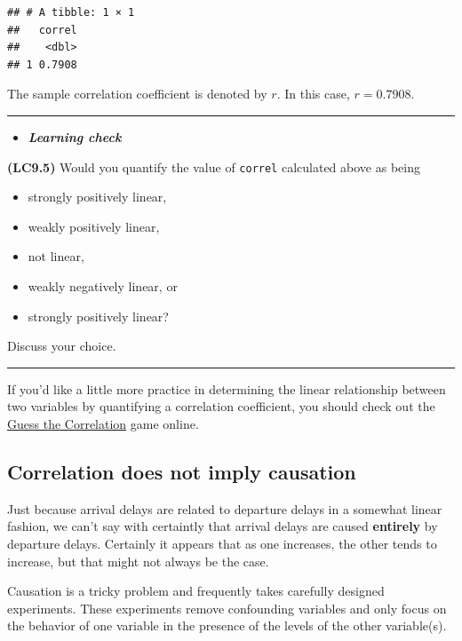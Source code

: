 \documentclass[]{tufte-book}
\let\oldrule=\rule
\renewcommand{\rule}[1]{\oldrule{\linewidth}}
\providecommand{\tightlist}{%
  \setlength{\itemsep}{0pt}\setlength{\parskip}{0pt}}
\newenvironment{rmdblock}[1]
  {\begin{shaded*}
  \begin{itemize}
  \renewcommand{\labelitemi}{
    \raisebox{-.7\height}[0pt][0pt]{
    }
  }
  \item
  }
  {
  \end{itemize}
  \end{shaded*}
  }
\newenvironment{learncheck}
  {\begin{rmdblock}{warning}}
  {\end{rmdblock}}
\begin{document}
\begin{verbatim}
## # A tibble: 1 × 1
##   correl
##    <dbl>
## 1 0.7908
\end{verbatim}

The sample correlation coefficient is denoted by \(r\). In this case,
\(r = 0.7908\).

\begin{center}\rule{0.5\linewidth}{\linethickness}\end{center}

\begin{learncheck}
\textbf{\emph{Learning check}}
\end{learncheck}

\textbf{(LC9.5)} Would you quantify the value of \texttt{correl}
calculated above as being

\begin{itemize}
\tightlist
\item
  strongly positively linear,
\item
  weakly positively linear,
\item
  not linear,
\item
  weakly negatively linear, or
\item
  strongly positively linear?
\end{itemize}

Discuss your choice.

\begin{center}\rule{0.5\linewidth}{\linethickness}\end{center}

If you'd like a little more practice in determining the linear
relationship between two variables by quantifying a correlation
coefficient, you should check out the
\href{http://guessthecorrelation.com/}{Guess the Correlation} game
online.

\subsection{Correlation does not imply
causation}\label{correlation-does-not-imply-causation}

Just because arrival delays are related to departure delays in a
somewhat linear fashion, we can't say with certaintly that arrival
delays are caused \textbf{entirely} by departure delays. Certainly it
appears that as one increases, the other tends to increase, but that
might not always be the case.

Causation is a tricky problem and frequently takes carefully designed
experiments. These experiments remove confounding variables and only
focus on the behavior of one variable in the presence of the levels of
the other variable(s).
\end{document}
